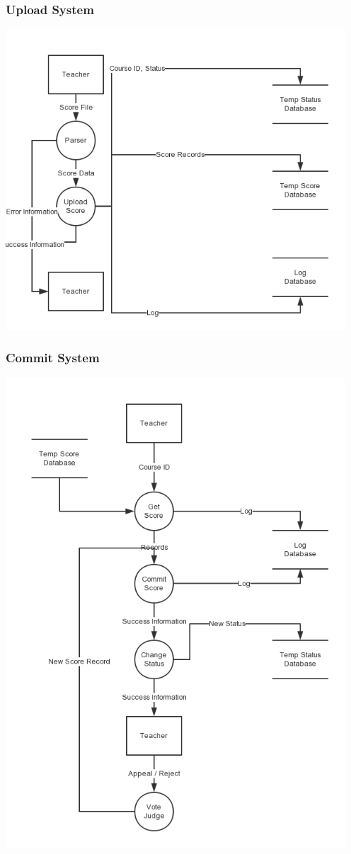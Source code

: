 \documentclass[a4]{article}
\begin{document}
\subsubsection{Upload System}
\includegraphics[width=5in]{pic/2-1.png}
\subsubsection{Commit System}
\includegraphics[width=5in]{pic/2-2.png}
\end{document}
